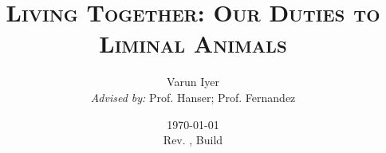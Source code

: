 \documentclass[12pt,oneside]{book}
\author{Varun Iyer \\ \emph{Advised by:} Prof. Hanser; Prof. Fernandez}
\date{\today \\ Rev. \texttt{}, Build \texttt{}}
\title{\textsc{Living Together: Our Duties to Liminal Animals}}
\begin{document}
\maketitle
\tableofcontents





\nocite{*}
\printbibliography
\end{document}
